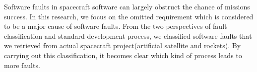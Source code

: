 Software faults in spacecraft software can largely obstruct the chance of missions success.
In this research, we focus on the omitted requirement which is considered to be a major cause of software faults.
From the two perspectives of fault classification and standard development process, we classified software faults that we retrieved from actual spacecraft project(artificial satellite and rockets).
By carrying out this classification, it becomes clear which kind of process leads to more faults.
